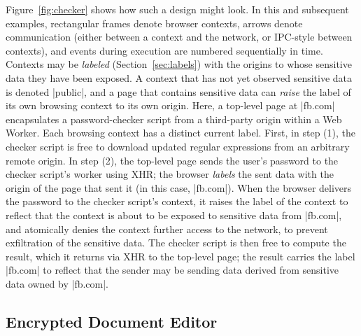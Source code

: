 Figure~\ref{fig:checker} shows how such a design might look. In this
and subsequent examples, rectangular frames denote browser contexts,
arrows denote communication (either between a context and the network,
or IPC-style between contexts), and events during execution are
numbered sequentially in time. Contexts may be \emph{labeled} (Section~\ref{sec:labels}) with the
origins to whose sensitive data they have been exposed. A context that
has not yet observed sensitive data is denoted \js|public|, and a page
that contains sensitive data can \emph{raise} the label of its own
browsing context to its own origin. Here, a top-level page at
\js|fb.com| encapsulates a password-checker script from a third-party
origin within a Web Worker. Each browsing context has a
distinct current label. First, in step (1), the checker script is free
to download updated regular expressions from an arbitrary remote
origin. In step (2), the top-level page sends the user's password to
the checker script's worker using XHR\@; the browser \emph{labels} the
sent data with the origin of the page that sent it (in this case,
\js|fb.com|). When the browser delivers the password to the checker
script's context, it raises the label of the context to reflect that
the context is about to be exposed to sensitive data from \js|fb.com|,
and atomically denies the context further access to the network, to
prevent exfiltration of the sensitive data. The checker script is then
free to compute the result, which it returns via XHR to the top-level
page; the result carries the label \js|fb.com| to reflect that the
sender may be sending data derived from sensitive data owned by
\js|fb.com|.

\subsection{Encrypted Document Editor}

